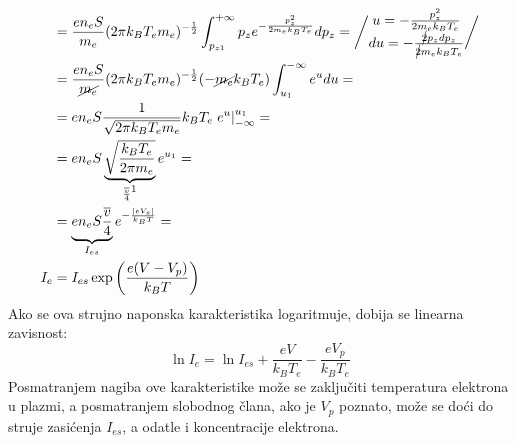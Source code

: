 \documentclass[fleqn]{report}
\begin{document}
\begin{enumerate}
\begin{align*}
                  & = \frac{e n_e S}{m_e} (2 \pi k_B T_e m_e)^{-\frac{1}{2}} \int_{p_{z1}}^{+\infty} p_z e^{-\frac{p_z^2}{2m_e k_B T_e}}dp_z = \bigg/ \begin{matrix}
                                                                                                                                                          u = -\frac{p_z^2}{2 m_e k_B T_e} \\
                                                                                                                                                          du = -\frac{\cancel 2 p_z dp_z}{\cancel 2 m_e k_B T_e}
                                                                                                                                                      \end{matrix} \bigg/                                                                         \\
                  & = \frac{e n_e S}{\cancel{m_e}} (2 \pi k_B T_e m_e)^{-\frac{1}{2}} (-\cancel{m_e} k_B T_e) \int_{u_1}^{-\infty} e^u du =                                                                                                                                             \\
                  & = e n_e S \frac{1}{\sqrt{2 \pi k_B T_e m_e}} k_B T_e \left. e^u \right|_{-\infty}^{u_1} =                                                                                                                                                                           \\
                  & = e n_e S \underbrace{\sqrt{\frac{k_B T_e}{2 \pi m_e}}}_{\frac{\overline{v}}{4}\footnotemark} e^{u_1} =                                                                                                                                                             \\
                  & = \underbrace{e n_e S \frac{\overline{v}}{4}}_{I_{es}} e^{-\frac{|eV_s|}{k_B T}} =                                                                                                                                                                                  \\
              I_e & = I_{es} \exp\left(\frac{e(V - V_p)}{k_B T}\right)
          \end{align*}
          Ako se ova strujno naponska karakteristika logaritmuje, dobija se linearna zavisnost:
          \[ \ln I_e = \ln I_{es} + \frac{eV}{k_B T_e} - \frac{e V_p}{k_B T_e} \]
          Posmatranjem nagiba ove karakteristike može se zaključiti temperatura elektrona u plazmi, a posmatranjem slobodnog člana, ako je $V_p$ poznato, može se doći do struje zasićenja $I_{es}$, a odatle i koncentracije elektrona.


\end{enumerate}
\end{document}
